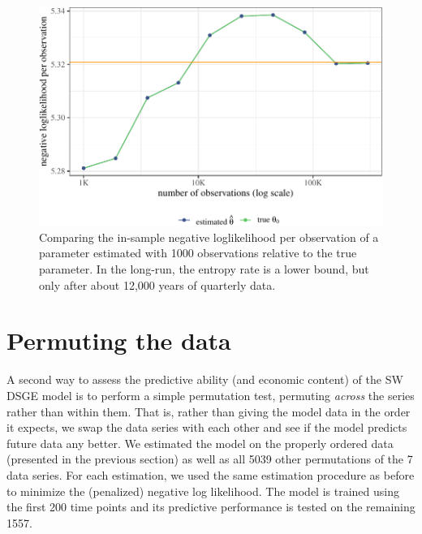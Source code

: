 \documentclass[11pt]{article}
\begin{document}
\begin{figure}[t]

{\centering \includegraphics{gfx/entropy-investigation-1} 

}

\caption{Comparing the in-sample negative loglikelihood per observation of a parameter estimated with 1000 observations relative to the true parameter. In the long-run, the entropy rate is a lower bound, but only after about 12,000 years of quarterly data.}\label{fig:entropy-investigation}
\end{figure}

\clearpage

\hypertarget{sec:permutation-summary}{%
\section{Permuting the data}\label{sec:permutation-summary}}

A second way to assess the predictive ability (and economic content) of
the SW DSGE model is to perform a simple permutation test, permuting
\emph{across} the series rather than within them. That is, rather than
giving the model data in the order it expects, we swap the data series
with each other and see if the model predicts future data any better. We
estimated the model on the properly ordered data (presented in the
previous section) as well as all 5039 other permutations of the 7 data
series. For each estimation, we used the same estimation procedure as
before to minimize the (penalized) negative log likelihood. The model is
trained using the first 200 time points and its predictive performance
is tested on the remaining 1557.
\end{document}
